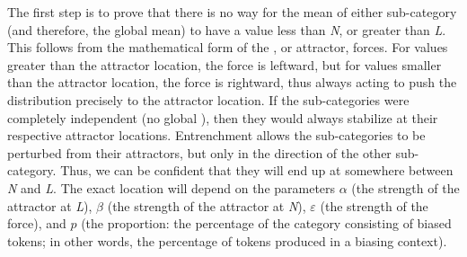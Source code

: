 The first step is to prove that there is no way for the mean of either
sub-category (and therefore, the global mean) to have a value less
than \emph{N}, or greater than \emph{L}. This follows from the mathematical
form of the , or attractor, forces. For values greater than
the attractor location, the force is leftward, but for values smaller
than the attractor location, the force is rightward, thus always acting
to push the distribution precisely to the attractor location. If the
sub-categories were completely independent (no global ),
then they would always stabilize at their respective attractor locations.
Entrenchment allows the sub-categories to be perturbed from their
attractors, but only in the direction of the other sub-category. Thus,
we can be confident that they will end up at  somewhere
between \emph{N} and \emph{L}. The exact location will depend on the
parameters $\alpha$ (the strength of the attractor at \emph{L}),
$\beta$ (the strength of the attractor at \emph{N}), $\varepsilon$
(the strength of the  force), and $p$ (the  proportion:
the percentage of the category consisting of biased tokens; in other
words, the percentage of tokens produced in a biasing context). 

